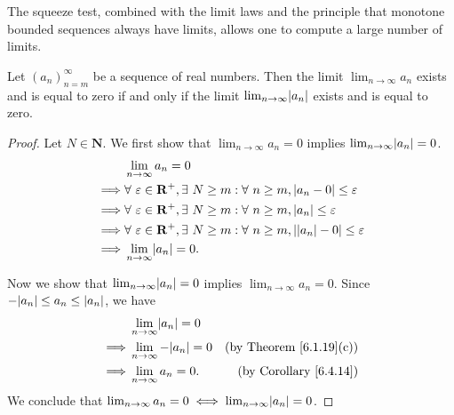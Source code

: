 \setcounter{theorem}{15}
\begin{remark}\label{6.4.16}
    The squeeze test, combined with the limit laws and the principle that monotone bounded sequences always have limits, allows one to compute a large number of limits.
\end{remark}

\begin{corollary}\label{6.4.17}
    Let \((a_n)_{n = m}^\infty\) be a sequence of real numbers.
    Then the limit \(\lim_{n \to \infty} a_n\) exists and is equal to zero if and only if the limit \(\lim_{n \to \infty} \abs*{a_n}\) exists and is equal to zero.
\end{corollary}

\begin{proof}
    Let \(N \in \mathbf{N}\).
    We first show that \(\lim_{n \to \infty} a_n = 0\) implies \(\lim_{n \to \infty} \abs*{a_n} = 0\).
    \begin{align*}
                 & \lim_{n \to \infty} a_n = 0                                                                                          \\
        \implies & \forall\ \varepsilon \in \mathbf{R}^+, \exists\ N \geq m : \forall\ n \geq m, \abs*{a_n - 0} \leq \varepsilon        \\
        \implies & \forall\ \varepsilon \in \mathbf{R}^+, \exists\ N \geq m : \forall\ n \geq m, \abs*{a_n} \leq \varepsilon            \\
        \implies & \forall\ \varepsilon \in \mathbf{R}^+, \exists\ N \geq m : \forall\ n \geq m, \abs*{\abs*{a_n} - 0} \leq \varepsilon \\
        \implies & \lim_{n \to \infty} \abs*{a_n} = 0.
    \end{align*}

    Now we show that \(\lim_{n \to \infty} \abs*{a_n} = 0\) implies \(\lim_{n \to \infty} a_n = 0\).
    Since \(-\abs*{a_n} \leq a_n \leq \abs*{a_n}\), we have
    \begin{align*}
                 & \lim_{n \to \infty} \abs*{a_n} = 0                                        \\
        \implies & \lim_{n \to \infty} -\abs*{a_n} = 0 & \text{(by Theorem \ref{6.1.19}(c))} \\
        \implies & \lim_{n \to \infty} a_n = 0.        & \text{(by Corollary \ref{6.4.14})}
    \end{align*}
    We conclude that \(\lim_{n \to \infty} a_n = 0 \iff \lim_{n \to \infty} \abs*{a_n} = 0\).
\end{proof}

